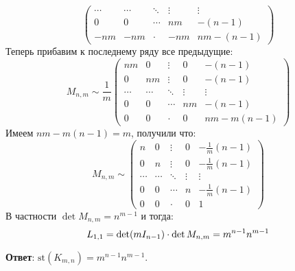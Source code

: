 \documentclass[a4paper,12pt,twoside]{article}
\begin{document}
\begin{solution}{}
\[\begin{pmatrix}
   \cdots &\cdots & \ddots & \vdots & \vdots \\
    0     & 0     & \cdots &  nm    & -(n-1)\\
    -nm   & -nm   & \cdot  & -nm    & nm -(n-1) 
\end{pmatrix}
\]
Теперь прибавим к последнему ряду все предыдущие:
\[
    M_{n, m} \sim \frac{1}{m}\begin{pmatrix}
    nm    & 0     & \vdots & 0      & -(n-1)\\
    0     & nm    & \vdots & 0      & -(n-1)\\
   \cdots &\cdots & \ddots & \vdots & \vdots \\
    0     & 0     & \cdots &  nm    & -(n-1)\\
    0     & 0     & \cdot  & 0      & nm - m(n-1)
\end{pmatrix}
\]
Имеем \(nm - m(n-1) = m\), получили что:
\[
    M_{n, m} \sim \begin{pmatrix}
    n    & 0     & \vdots & 0      & -\frac{1}{m}(n-1)\\
    0     & n    & \vdots & 0      & -\frac{1}{m}(n-1)\\
   \cdots &\cdots & \ddots & \vdots & \vdots \\
    0     & 0     & \cdots &  n    & -\frac{1}{m}(n-1)\\
    0     & 0     & \cdot  & 0      & 1
\end{pmatrix}
\]
В частности \(\det M_{n, m} = n^{m - 1}\) и тогда:
\[
    L_{1, 1} = \det\mleft( m I_{n-1} \mright) \cdot \det M_{n, m} = m^{n-1}n^{m-1}
\]

\noindent \textbf{Ответ}: \(\mathrm{st}(K_{m, n}) =  m^{n-1}n^{m-1}\).
\end{solution}
\end{document}
